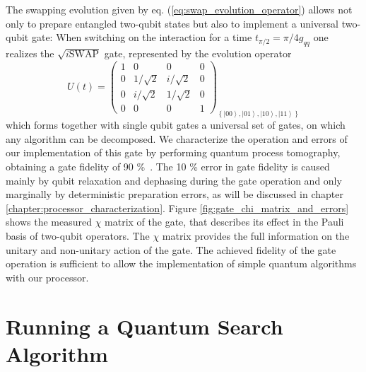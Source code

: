 The swapping evolution given by eq. (\ref{eq:swap_evolution_operator})
allows not only to prepare entangled two-qubit states but also to
implement a universal two-qubit gate:
When switching on the interaction for a time $t_{\pi/2}=\pi/4g_{qq}$ one
realizes the $\sqrt{i\mathrm{SWAP}}$ gate, represented
by the evolution operator
%
\begin{equation}
U(t)=\left(\begin{array}{cccc}
1 & 0 & 0 & 0\\
0 & 1/\sqrt{2} & i/\sqrt{2} & 0\\
0 & i/\sqrt{2} & 1/\sqrt{2} & 0\\
0 & 0 & 0 & 1\end{array}\right)_{\left\{ \left|00\right\rangle ,\left|01\right\rangle ,\left|10\right\rangle ,\left|11\right\rangle \right\} } \label{eq:sqrt_iswap_gate}
\end{equation}
%
which forms together with single qubit gates a universal set
of gates, on which any algorithm can be decomposed. We characterize
the operation and errors of our implementation of this gate by performing
quantum process tomography, obtaining a gate fidelity of 90 \%\ .
The 10 \% error in gate fidelity is caused mainly by qubit relaxation
and dephasing during the gate operation and only marginally by deterministic
preparation errors, as will be discussed in chapter \ref{chapter:processor_characterization}. Figure \ref{fig:gate_chi_matrix_and_errors}
shows the measured $\chi$ matrix of the gate, that describes its
effect in the Pauli basis of two-qubit operators. The $\chi$ matrix
provides the full information on the unitary and non-unitary action
of the gate. The achieved fidelity of the gate operation is sufficient
to allow the implementation of simple quantum algorithms with our
processor.


\section{Running a Quantum Search Algorithm}


